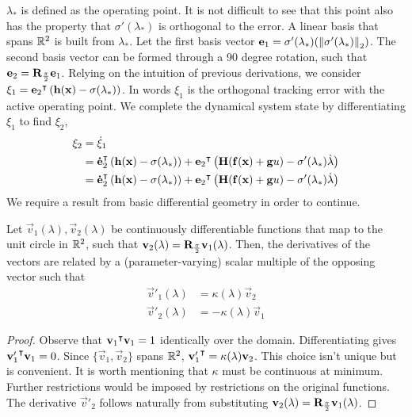\documentclass[oneside, 11pt]{book}
\begin{document}
$\lambda_*$ is defined as the operating point. It is not difficult to see that this point also has the property that $\sigma'(\lambda_*)$ is orthogonal to the error. A linear basis that spans $\mathbb{R}^2$ is built from $\lambda_*$. Let the first basis vector $\mathbf{e}_1 = \sigma'(\lambda_*)(\left\|\sigma'(\lambda_*)\right\|_2)$. The second basis vector can be formed through a 90 degree rotation, such that $\mathbf{e}_2 = \mathbf{R}_{\frac{\pi}{2}}\mathbf{e}_1$. Relying on the intuition of previous derivations, we consider $\xi_1 = {\mathbf{e}_2}^{\intercal}\left(\mathbf{h}(\mathbf{x}) - \sigma(\lambda_*)\right)$. In words $\xi_1$ is the orthogonal tracking error with the active operating point. We complete the dynamical system state by differentiating $\xi_1$ to find $\xi_2$,
\begin{align*}
    \xi_2   &=  \dot{\xi}_1\\
            &=  {\mathbf{\dot{e}}_2}^{\intercal}\left(\mathbf{h}(\mathbf{x}) - \sigma(\lambda_*)\right)
                +
                {\mathbf{e}_2}^{\intercal}\left(\mathbf{H}(\mathbf{f}(\mathbf{x}) + \mathbf{g}u) - \sigma'(\lambda_*)\dot{\lambda} \right)\\
            &=  {\mathbf{\dot{e}}_2}^{\intercal}\left(\mathbf{h}(\mathbf{x}) - \sigma(\lambda_*)\right)
                +
                {\mathbf{e}_2}^{\intercal}\left(\mathbf{H}(\mathbf{f}(\mathbf{x}) + \mathbf{g}u) - \sigma'(\lambda_*)\dot{\lambda} \right)
\end{align*}
We require a result from basic differential geometry in order to continue.
\begin{lemma}
    Let $\vec{v}_1(\lambda), \vec{v}_2(\lambda)$ be continuously differentiable functions that map to the unit circle in $\mathbb{R}^2$, such that $\mathbf{v}_2(\lambda)=\mathbf{R}_{\frac{\pi}{2}}\mathbf{v}_1(\lambda)$. Then, the derivatives of the vectors are related by a (parameter-varying) scalar multiple of the opposing vector such that
    \begin{align*}
        \vec{v}'_1(\lambda) &= \kappa(\lambda)\vec{v}_2 \\
        \vec{v}'_2(\lambda) &= -\kappa(\lambda)\vec{v}_1
    \end{align*}
    \label{lem:sf_frame}
\end{lemma}
\begin{proof}
    Observe that ${\mathbf{v}_1}^{\intercal}\mathbf{v}_1=1$ identically over the domain. Differentiating gives ${\mathbf{v}'_1}^{\intercal}\mathbf{v}_1=0$. Since $\{\vec{v}_1,\vec{v}_2\}$ spans $\mathbb{R}^2$, ${\mathbf{v}'_1}^{\intercal}=\kappa(\lambda)\mathbf{v}_2$. This choice isn't unique but is convenient. It is worth mentioning that $\kappa$ must be continuous at minimum. Further restrictions would be imposed by restrictions on the original functions. The derivative $\vec{v}'_2$ follows naturally from substituting $\mathbf{v}_2(\lambda)=\mathbf{R}_{\frac{\pi}{2}}\mathbf{v}_1(\lambda)$.
\end{proof}
\end{document}
